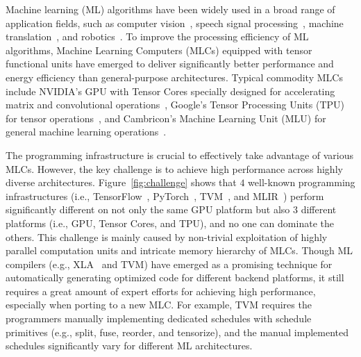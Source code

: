 \documentclass[pageno]{jpaper}
\begin{document}
Machine learning (ML) algorithms have been widely used in a broad range of application fields, such as computer vision~\cite{liu2016ssd}, speech signal processing~\cite{amodei2016deep}, machine translation~\cite{bahdanau2014neural}, and robotics~\cite{redmon2015real}. To improve the processing efficiency of ML algorithms, Machine Learning Computers (MLCs) equipped with tensor functional units have emerged to deliver significantly better performance and energy efficiency than general-purpose architectures. Typical commodity MLCs include NVIDIA's GPU with Tensor Cores specially designed for accelerating matrix and convolutional operations~\cite{markidis2018nvidia}, Google's Tensor Processing Units (TPU) for tensor operations~\cite{jouppi2017datacenter}, and Cambricon's Machine Learning Unit (MLU) for general machine learning operations~\cite{cambrion2016url}.


The programming infrastructure is crucial to effectively take advantage of various MLCs. However, the key challenge is to achieve high performance across highly diverse architectures. Figure~\ref{fig:challenge} shows that $4$ well-known programming infrastructures (i.e., TensorFlow~\cite{abadi2016tensorflow}, PyTorch~\cite{paszke2017automatic}, TVM~\cite{chen2018tvm}, and MLIR~\cite{Lattner2020MLIR}) perform significantly different on not only the same GPU platform but also $3$ different platforms (i.e., GPU, Tensor Cores, and TPU), and no one can dominate the others. This challenge is mainly caused by non-trivial exploitation of highly parallel computation units and intricate memory hierarchy of MLCs. Though ML compilers (e.g., XLA~\cite{tensorflow2016xla} and TVM) have emerged as a promising technique for automatically generating optimized code for different backend platforms, it still requires a great amount of expert efforts for achieving high performance, especially when porting to a new MLC. For example, TVM requires the programmers manually implementing dedicated schedules with schedule primitives (e.g., split, fuse, reorder, and tensorize), and the manual implemented schedules significantly vary for different ML architectures. 
\end{document}
